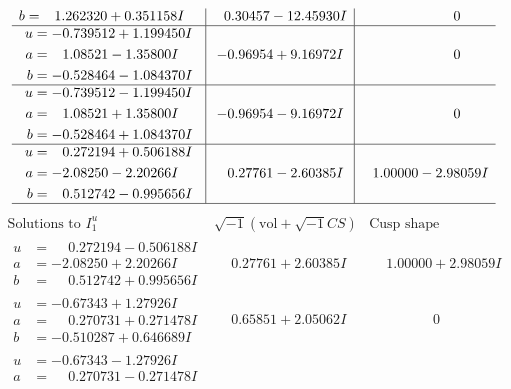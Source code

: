 \documentclass[1p]{elsarticle_modified}
\theoremstyle{definition}
\newcommand{\I}{\sqrt{-1}}
\begin{document}
$$\begin{array}{c|c|c}
\begin{aligned}
b &= \phantom{-}1.262320 + 0.351158 I\end{aligned}
 & \phantom{-}0.30457 - 12.45930 I & \phantom{-0.000000 } 0 \\ \hline\begin{aligned}
u &= -0.739512 + 1.199450 I \\
a &= \phantom{-}1.08521 - 1.35800 I \\
b &= -0.528464 - 1.084370 I\end{aligned}
 & -0.96954 + 9.16972 I & \phantom{-0.000000 } 0 \\ \hline\begin{aligned}
u &= -0.739512 - 1.199450 I \\
a &= \phantom{-}1.08521 + 1.35800 I \\
b &= -0.528464 + 1.084370 I\end{aligned}
 & -0.96954 - 9.16972 I & \phantom{-0.000000 } 0 \\ \hline\begin{aligned}
u &= \phantom{-}0.272194 + 0.506188 I \\
a &= -2.08250 - 2.20266 I \\
b &= \phantom{-}0.512742 - 0.995656 I\end{aligned}
 & \phantom{-}0.27761 - 2.60385 I & \phantom{-}1.00000 - 2.98059 I\\
 \hline 
 \end{array}$$\newpage$$\begin{array}{c|c|c}  
\text{Solutions to }I^u_{1}& \I (\text{vol} + \sqrt{-1}CS) & \text{Cusp shape}\\
 \hline 
\begin{aligned}
u &= \phantom{-}0.272194 - 0.506188 I \\
a &= -2.08250 + 2.20266 I \\
b &= \phantom{-}0.512742 + 0.995656 I\end{aligned}
 & \phantom{-}0.27761 + 2.60385 I & \phantom{-}1.00000 + 2.98059 I \\ \hline\begin{aligned}
u &= -0.67343 + 1.27926 I \\
a &= \phantom{-}0.270731 + 0.271478 I \\
b &= -0.510287 + 0.646689 I\end{aligned}
 & \phantom{-}0.65851 + 2.05062 I & \phantom{-0.000000 } 0 \\ \hline\begin{aligned}
u &= -0.67343 - 1.27926 I \\
a &= \phantom{-}0.270731 - 0.271478 I \\

\end{aligned}
\end{array}$$
\end{document}

